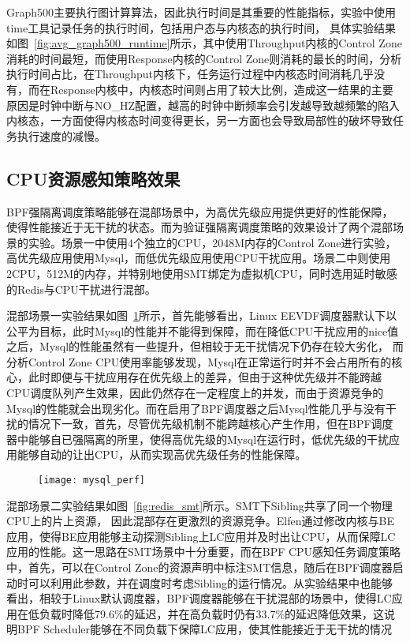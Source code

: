 Graph500主要执行图计算算法，因此执行时间是其重要的性能指标，实验中使用time工具记录任务的执行时间，包括用户态与内核态的执行时间， 具体实验结果如图~\ref{fig:avg_graph500_runtime}所示，其中使用Throughput内核的Control Zone消耗的时间最短，而使用Response内核的Control Zone则消耗的最长的时间，分析执行时间占比，在Throughput内核下，任务运行过程中内核态时间消耗几乎没有，而在Response内核中，内核态时间则占用了较大比例，造成这一结果的主要原因是时钟中断与NO\_HZ配置，越高的时钟中断频率会引发越导致越频繁的陷入内核态，一方面使得内核态时间变得更长，另一方面也会导致局部性的破坏导致任务执行速度的减慢。

\subsection{CPU资源感知策略效果}


BPF强隔离调度策略能够在混部场景中，为高优先级应用提供更好的性能保障，使得性能接近于无干扰的状态。而为验证强隔离调度策略的效果设计了两个混部场景的实验。场景一中使用4个独立的CPU，2048M内存的Control Zone进行实验，高优先级应用使用Mysql，而低优先级应用使用CPU干扰应用。场景二中则使用2CPU，512M的内存，并特别地使用SMT绑定为虚拟机CPU，同时选用延时敏感的Redis与CPU干扰进行混部。

混部场景一实验结果如图~\ref{fig:mysql_perf}所示，首先能够看出，Linux EEVDF调度器默认下以公平为目标，此时Mysql的性能并不能得到保障，而在降低CPU干扰应用的nice值之后，Mysql的性能虽然有一些提升，但相较于无干扰情况下仍存在较大劣化， 而分析Control Zone CPU使用率能够发现，Mysql在正常运行时并不会占用所有的核心，此时即便与干扰应用存在优先级上的差异，但由于这种优先级并不能跨越CPU调度队列产生效果，因此仍然存在一定程度上的并发，而由于资源竞争的Mysql的性能就会出现劣化。而在启用了BPF调度器之后Mysql性能几乎与没有干扰的情况下一致，首先，尽管优先级机制不能跨越核心产生作用，但在BPF调度器中能够自已强隔离的所里，使得高优先级的Mysql在运行时，低优先级的干扰应用能够自动的让出CPU，从而实现高优先级任务的性能保障。

\begin{figure}[!htbp]
    \centering
    \texttt{[image: mysql\_perf]}
    \label{fig:mysql_perf}
\end{figure}

混部场景二实验结果如图~\ref{fig:redis_smt}所示。SMT下Sibling共享了同一个物理CPU上的片上资源， 因此混部存在更激烈的资源竞争。Elfen\citep{yang2016elfen}通过修改内核与BE应用，使得BE应用能够主动探测Sibling上LC应用并及时出让CPU，从而保障LC应用的性能。这一思路在SMT场景中十分重要，而在BPF CPU感知任务调度策略中，首先，可以在Control Zone的资源声明中标注SMT信息，随后在BPF调度器启动时可以利用此参数，并在调度时考虑Sibling的运行情况。从实验结果中也能够看出，相较于Linux默认调度器，BPF调度器能够在干扰混部的场景中，使得LC应用在低负载时降低79.6\%的延迟，并在高负载时仍有33.7\%的延迟降低效果，这说明BPF Scheduler能够在不同负载下保障LC应用，使其性能接近于无干扰的情况

